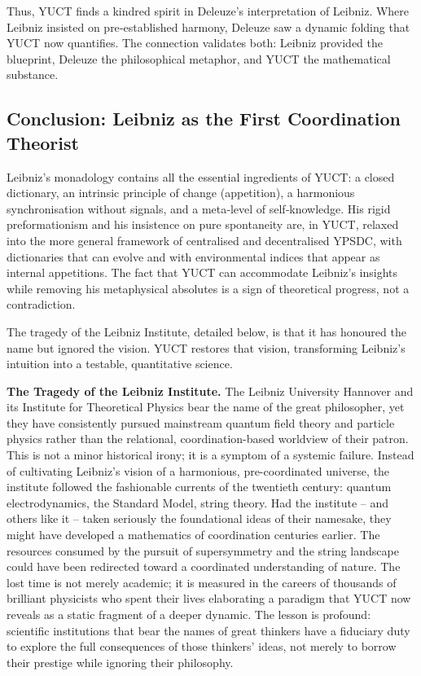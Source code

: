 \documentclass[12pt,a4paper]{article}
\begin{document}
	Thus, YUCT finds a kindred spirit in Deleuze’s interpretation of Leibniz. Where Leibniz insisted on pre‑established harmony, Deleuze saw a dynamic folding that YUCT now quantifies. The connection validates both: Leibniz provided the blueprint, Deleuze the philosophical metaphor, and YUCT the mathematical substance.
	
	\subsection{Conclusion: Leibniz as the First Coordination Theorist}
	
	Leibniz’s monadology contains all the essential ingredients of YUCT: a closed dictionary, an intrinsic principle of change (appetition), a harmonious synchronisation without signals, and a meta‑level of self‑knowledge. His rigid preformationism and his insistence on pure spontaneity are, in YUCT, relaxed into the more general framework of centralised and decentralised YPSDC, with dictionaries that can evolve and with environmental indices that appear as internal appetitions. The fact that YUCT can accommodate Leibniz’s insights while removing his metaphysical absolutes is a sign of theoretical progress, not a contradiction.
	
	The tragedy of the Leibniz Institute, detailed below, is that it has honoured the name but ignored the vision. YUCT restores that vision, transforming Leibniz’s intuition into a testable, quantitative science.
	
	\textbf{The Tragedy of the Leibniz Institute.} The Leibniz University Hannover and its Institute for Theoretical Physics bear the name of the great philosopher, yet they have consistently pursued mainstream quantum field theory and particle physics rather than the relational, coordination-based worldview of their patron. This is not a minor historical irony; it is a symptom of a systemic failure. Instead of cultivating Leibniz's vision of a harmonious, pre-coordinated universe, the institute followed the fashionable currents of the twentieth century: quantum electrodynamics, the Standard Model, string theory. Had the institute -- and others like it -- taken seriously the foundational ideas of their namesake, they might have developed a mathematics of coordination centuries earlier. The resources consumed by the pursuit of supersymmetry and the string landscape could have been redirected toward a coordinated understanding of nature. The lost time is not merely academic; it is measured in the careers of thousands of brilliant physicists who spent their lives elaborating a paradigm that YUCT now reveals as a static fragment of a deeper dynamic. The lesson is profound: scientific institutions that bear the names of great thinkers have a fiduciary duty to explore the full consequences of those thinkers' ideas, not merely to borrow their prestige while ignoring their philosophy.
	
\end{document}
